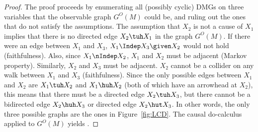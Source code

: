 \begin{proof}
The proof proceeds by enumerating all (possibly cyclic) DMGs on three variables that the observable graph
$G^O(M)$ could be, and ruling out the ones that do not satisfy the assumptions.
The assumption that $X_2$ is not a cause of $X_1$ implies that there is no directed edge
$X_2 \tuh X_1$ in the graph $G^O(M)$. If there were an edge between $X_1$ and $X_3$,
$X_1 \Indep X_3 \given X_2$ would not hold (faithfulness). Also, since $X_1 \nIndep X_2$, $X_1$ and
$X_2$ must be adjacent (Markov property). Similarly, $X_2$ and $X_3$ must be adjacent. $X_2$ cannot be
a collider on any walk between $X_1$ and $X_3$ (faithfulness). Since the only possible edges between
$X_1$ and $X_2$ are $X_1 \tuh X_2$ and $X_1 \huh X_2$ (both of which have an arrowhead at $X_2$), 
this means that there must be a
directed edge $X_2 \tuh X_3$, but there cannot be a  bidirected edge $X_2 \huh X_3$ or directed edge $X_2 \hut X_3$. 
In other words, the only three possible graphs are the ones in Figure~\ref{fig:LCD}.
The causal do-calculus applied to $G^O(M)$ yields .
\end{proof}

